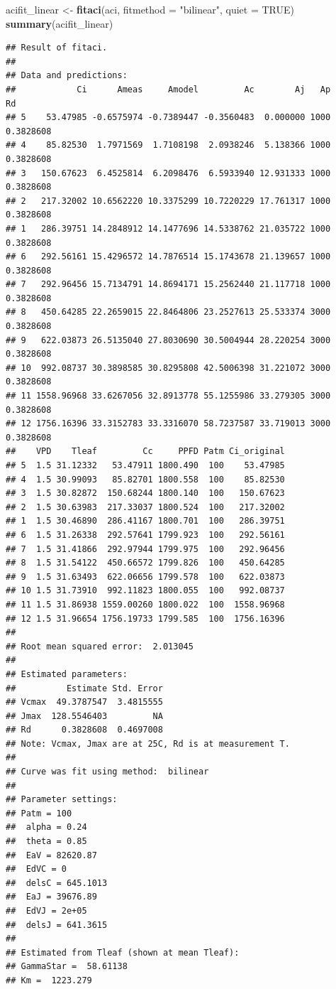 \documentclass[
]{krantz}
\makeatletter
\newenvironment{Shaded}{\begin{snugshade}}{\end{snugshade}}
\newcommand{\DataTypeTok}[1]{\textcolor[rgb]{0.13,0.29,0.53}{#1}}
\newcommand{\KeywordTok}[1]{\textcolor[rgb]{0.13,0.29,0.53}{\textbf{#1}}}
\newcommand{\NormalTok}[1]{#1}
\newcommand{\OtherTok}[1]{\textcolor[rgb]{0.56,0.35,0.01}{#1}}
\newcommand{\StringTok}[1]{\textcolor[rgb]{0.31,0.60,0.02}{#1}}
\newenvironment{kframe}{%
\medskip{}
\setlength{\fboxsep}{.8em}
 \def\at@end@of@kframe{}%
 \ifinner\ifhmode%
  \def\at@end@of@kframe{\end{minipage}}%
  \begin{minipage}{\columnwidth}%
 \fi\fi%
 \def\FrameCommand##1{\hskip\@totalleftmargin \hskip-\fboxsep
 \colorbox{shadecolor}{##1}\hskip-\fboxsep
     \hskip-\linewidth \hskip-\@totalleftmargin \hskip\columnwidth}%
 \MakeFramed {\advance\hsize-\width
   \@totalleftmargin\z@ \linewidth\hsize
   \@setminipage}}%
 {\par\unskip\endMakeFramed%
 \at@end@of@kframe}
\renewenvironment{Shaded}{\begin{kframe}}{\end{kframe}}
\makeatother
\begin{document}
\begin{Shaded}
\begin{Highlighting}[]
\NormalTok{acifit_linear <-}\StringTok{ }\KeywordTok{fitaci}\NormalTok{(aci,  }\DataTypeTok{fitmethod =} \StringTok{"bilinear"}\NormalTok{, }\DataTypeTok{quiet =} \OtherTok{TRUE}\NormalTok{)}
\KeywordTok{summary}\NormalTok{(acifit_linear)}
\end{Highlighting}
\end{Shaded}

\begin{verbatim}
## Result of fitaci.
## 
## Data and predictions:
##            Ci      Ameas     Amodel         Ac        Aj   Ap        Rd
## 5    53.47985 -0.6575974 -0.7389447 -0.3560483  0.000000 1000 0.3828608
## 4    85.82530  1.7971569  1.7108198  2.0938246  5.138366 1000 0.3828608
## 3   150.67623  6.4525814  6.2098476  6.5933940 12.931333 1000 0.3828608
## 2   217.32002 10.6562220 10.3375299 10.7220229 17.761317 1000 0.3828608
## 1   286.39751 14.2848912 14.1477696 14.5338762 21.035722 1000 0.3828608
## 6   292.56161 15.4296572 14.7876514 15.1743678 21.139657 1000 0.3828608
## 7   292.96456 15.7134791 14.8694171 15.2562440 21.117718 1000 0.3828608
## 8   450.64285 22.2659015 22.8464806 23.2527613 25.533374 3000 0.3828608
## 9   622.03873 26.5135040 27.8030690 30.5004944 28.220254 3000 0.3828608
## 10  992.08737 30.3898585 30.8295808 42.5006398 31.221072 3000 0.3828608
## 11 1558.96968 33.6267056 32.8913778 55.1255986 33.279305 3000 0.3828608
## 12 1756.16396 33.3152783 33.3316070 58.7237587 33.719013 3000 0.3828608
##    VPD    Tleaf         Cc     PPFD Patm Ci_original
## 5  1.5 31.12332   53.47911 1800.490  100    53.47985
## 4  1.5 30.99093   85.82701 1800.558  100    85.82530
## 3  1.5 30.82872  150.68244 1800.140  100   150.67623
## 2  1.5 30.63983  217.33037 1800.524  100   217.32002
## 1  1.5 30.46890  286.41167 1800.701  100   286.39751
## 6  1.5 31.26338  292.57641 1799.923  100   292.56161
## 7  1.5 31.41866  292.97944 1799.975  100   292.96456
## 8  1.5 31.54122  450.66572 1799.826  100   450.64285
## 9  1.5 31.63493  622.06656 1799.578  100   622.03873
## 10 1.5 31.73910  992.11823 1800.055  100   992.08737
## 11 1.5 31.86938 1559.00260 1800.022  100  1558.96968
## 12 1.5 31.96654 1756.19733 1799.585  100  1756.16396
## 
## Root mean squared error:  2.013045 
## 
## Estimated parameters:
##          Estimate Std. Error
## Vcmax  49.3787547  3.4815555
## Jmax  128.5546403         NA
## Rd      0.3828608  0.4697008
## Note: Vcmax, Jmax are at 25C, Rd is at measurement T.
## 
## Curve was fit using method:  bilinear 
## 
## Parameter settings:
## Patm = 100
##  alpha = 0.24
##  theta = 0.85
##  EaV = 82620.87
##  EdVC = 0
##  delsC = 645.1013
##  EaJ = 39676.89
##  EdVJ = 2e+05
##  delsJ = 641.3615
## 
## Estimated from Tleaf (shown at mean Tleaf):
## GammaStar =  58.61138 
## Km =  1223.279
\end{verbatim}
\end{document}
